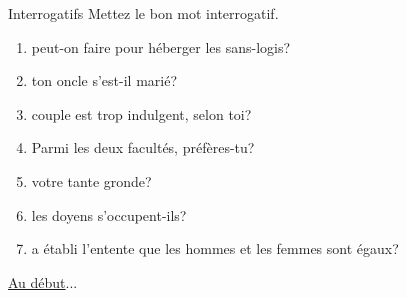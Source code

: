 \begin{frame}{Interrogatifs}
  Mettez le bon mot interrogatif.
  \begin{enumerate}
    \item \underline{} peut-on faire pour héberger les sans-logis?
    \item \underline{} ton oncle s'est-il marié?
    \item \underline{} couple est trop indulgent, selon toi?
    \item Parmi les deux facultés, \underline{} préfères-tu?
    \item \underline{} votre tante gronde?
    \item \underline{} les doyens s'occupent-ils?
    \item \underline{} a établi l'entente que les hommes et les femmes sont égaux?
  \end{enumerate}
  \vspace{0.25cm}
  \raggedleft\raggedleft\hyperlink{début}{Au début}...
\end{frame}
